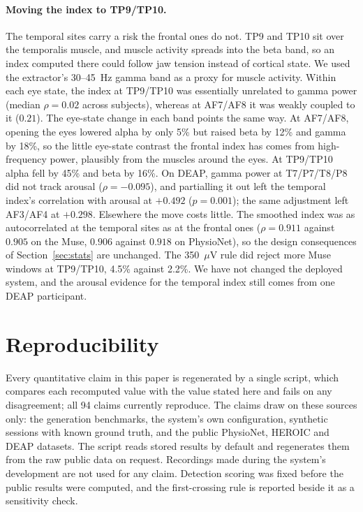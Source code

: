 \documentclass[11pt,a4paper]{article}
\begin{document}
\paragraph{Moving the index to TP9/TP10.} The temporal sites carry a risk the frontal ones
do not. TP9 and TP10 sit over the temporalis muscle, and muscle activity spreads into the
beta band, so an index computed there could follow jaw tension instead of cortical state. We
used the extractor's 30--45~Hz gamma band as a proxy for muscle activity. Within each eye
state, the index at TP9/TP10 was essentially unrelated to gamma power (median
$\rho = 0.02$ across subjects), whereas at AF7/AF8 it was weakly coupled to it ($0.21$). The
eye-state change in each band points the same way. At AF7/AF8, opening the eyes lowered
alpha by only 5\% but raised beta by 12\% and gamma by 18\%, so the little eye-state
contrast the frontal index has comes from high-frequency power, plausibly from the muscles
around the eyes. At TP9/TP10 alpha fell by 45\% and beta by 16\%. On DEAP, gamma power at
T7/P7/T8/P8 did not track arousal ($\rho = -0.095$), and partialling it out left the
temporal index's correlation with arousal at $+0.492$ ($p = 0.001$); the same adjustment
left AF3/AF4 at $+0.298$. Elsewhere the move costs little. The smoothed index was as
autocorrelated at the temporal sites as at the frontal ones ($\rho = 0.911$ against
$0.905$ on the Muse, $0.906$ against $0.918$ on PhysioNet), so the design consequences of
Section~\ref{sec:stats} are unchanged. The 350~$\mu$V rule did reject more Muse windows at
TP9/TP10, 4.5\% against 2.2\%. We have not changed the deployed system, and the arousal
evidence for the temporal index still comes from one DEAP participant.

\section{Reproducibility}
\label{sec:repro}

Every quantitative claim in this paper is regenerated by a single script, which compares
each recomputed value with the value stated here and fails on any disagreement; all 94
claims currently reproduce. The claims draw on these sources only: the generation
benchmarks, the system's own configuration, synthetic sessions with known ground truth, and
the public PhysioNet, HEROIC and DEAP datasets. The script reads stored results by default and
regenerates them from the raw public data on request. Recordings made during the system's
development are not used for any claim. Detection scoring was fixed before the public
results were computed, and the first-crossing rule is reported beside it as a sensitivity
check.
\end{document}

